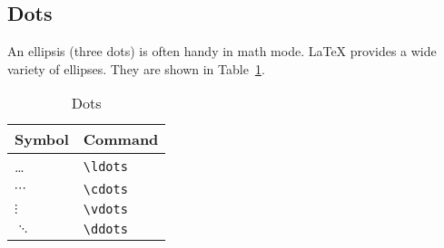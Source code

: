 \subsection{Dots}
\label{sec:dots}

An ellipsis (three dots) is often handy in math mode.  \LaTeX{}
provides a wide variety of ellipses.  They are shown in
Table~\ref{tab:dots}.
\begin{table}
  \centering
  \caption{Dots}
  \label{tab:dots}
  \begin{tabular}{@{}ll@{}}
    \toprule
    Symbol & Command \\
    \midrule
    \ldots & \verb?\ldots? \\
    $\cdots$ & \verb?\cdots? \\
    $\vdots$ & \verb?\vdots? \\
    $\ddots$ & \verb?\ddots? \\
    \bottomrule
  \end{tabular}
\end{table}

